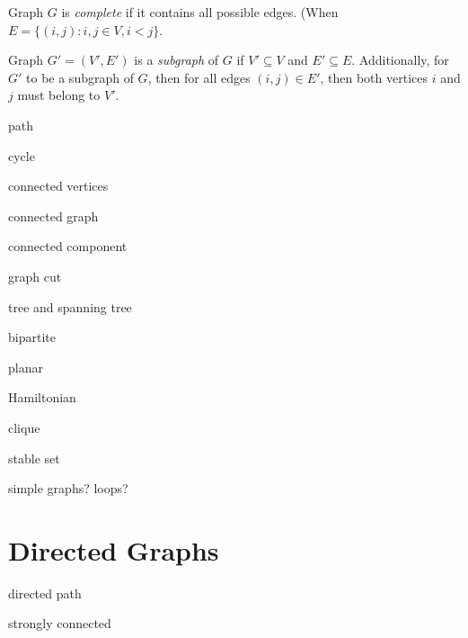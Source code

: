 \documentclass[12pt]{article}
\theoremstyle{definition}
\begin{document}
Graph $G$ is \emph{complete}  if it contains all possible edges. (When $E = \{(i,j): i,j \in V, i < j\}$. 

Graph $G' = (V', E')$ is a \emph{subgraph} of $G$ if $V' \subseteq V$ and $E' \subseteq E$. Additionally, for $G'$ to be a subgraph of $G$, then for all edges $(i,j) \in E'$, then both vertices $i$ and $j$ must belong to $V'$.

path

cycle

connected vertices

connected graph

connected component

graph cut

tree and spanning tree

bipartite

planar

Hamiltonian

clique

stable set




simple graphs?
loops?

\section{Directed Graphs}

directed path

strongly connected
\end{document}
